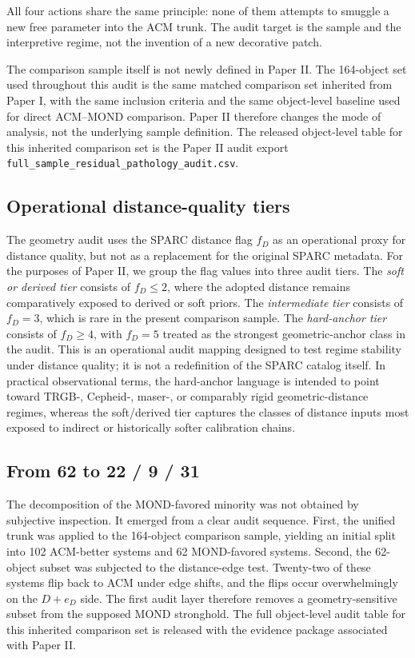 ﻿\documentclass[aps,prd,twocolumn,superscriptaddress,longbibliography,nofootinbib,floatfix,10pt]{revtex4-2}
\begin{document}
All four actions share the same principle: none of them attempts to smuggle a
new free parameter into the ACM trunk. The audit target is the sample and the
interpretive regime, not the invention of a new decorative patch.

The comparison sample itself is not newly defined in Paper II. The 164-object
set used throughout this audit is the same matched comparison set inherited
from Paper I, with the same inclusion criteria and the same object-level
baseline used for direct ACM--MOND comparison. Paper II therefore changes the
mode of analysis, not the underlying sample definition. The released
object-level table for this inherited comparison set is the Paper II audit
export \texttt{full\_sample\_residual\_pathology\_audit.csv}.

\subsection{Operational distance-quality tiers}

The geometry audit uses the SPARC distance flag $f_D$ as an operational proxy
for distance quality, but not as a replacement for the original SPARC metadata.
For the purposes of Paper II, we group the flag values into three audit tiers.
The \emph{soft or derived tier} consists of $f_D \leq 2$, where the adopted
distance remains comparatively exposed to derived or soft priors. The
\emph{intermediate tier} consists of $f_D = 3$, which is rare in the present
comparison sample. The \emph{hard-anchor tier} consists of $f_D \geq 4$, with
$f_D = 5$ treated as the strongest geometric-anchor class in the audit. This
is an operational audit mapping designed to test regime stability under
distance quality; it is not a redefinition of the SPARC catalog itself. In
practical observational terms, the hard-anchor language is intended to point
toward TRGB-, Cepheid-, maser-, or comparably rigid geometric-distance
regimes, whereas the soft/derived tier captures the classes of distance inputs
most exposed to indirect or historically softer calibration chains.

\subsection{From 62 to 22 / 9 / 31}

The decomposition of the MOND-favored minority was not obtained by subjective
inspection. It emerged from a clear audit sequence. First, the unified trunk
was applied to the 164-object comparison sample, yielding an initial split into
102 ACM-better systems and 62 MOND-favored systems. Second, the 62-object
subset was subjected to the distance-edge test. Twenty-two of these systems
flip back to ACM under edge shifts, and the flips occur overwhelmingly on the
$D + e_D$ side. The first audit layer therefore removes a geometry-sensitive
subset from the supposed MOND stronghold. The full object-level audit table for
this inherited comparison set is released with the evidence package associated
with Paper II.
\end{document}
